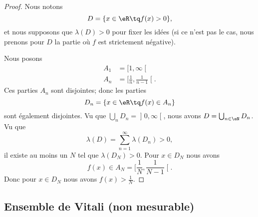 \begin{proof}
    Nous notons
    \begin{equation}
        D=\{ x\in \eR\tq f(x)>0 \},
    \end{equation}
    et nous supposons que \( \lambda(D)>0\) pour fixer les idées (si ce n'est pas le cas, nous prenons pour \( D\) la partie où \( f\) est strictement négative).

    Nous posons
    \begin{subequations}
        \begin{align}
            A_1&=\mathopen[ 1 , \infty \mathclose[\\
            A_n&=\mathopen[ \frac{1}{ n } , \frac{1}{ n-1 } \mathclose[.
        \end{align}
    \end{subequations}
    Ces parties \( A_n\) sont disjointes; donc les parties
    \begin{equation}
        D_n=\{ x\in \eR\tq f(x)\in A_n \}
    \end{equation}
sont également disjointes. Vu que \( \bigcup_nD_n=\mathopen] 0 , \infty \mathclose[\), nous avons \( D=\bigcup_{n\in \eN}D_n\). Vu que
    \begin{equation}
        \lambda(D)=\sum_{n=1}^{\infty}\lambda(D_n)>0,
    \end{equation}
    il existe au moins un \( N\) tel que \( \lambda(D_N)>0\). Pour \( x\in D_N\) nous avons
    \begin{equation}
        f(x)\in A_N=\mathopen[ \frac{1}{ N } , \frac{1}{ N-1 } \mathclose[.
    \end{equation}
    Donc pour \( x\in D_N\) nous avons \( f(x)>\frac{1}{ N }\).
\end{proof}

\subsection{Ensemble de Vitali (non mesurable)}

